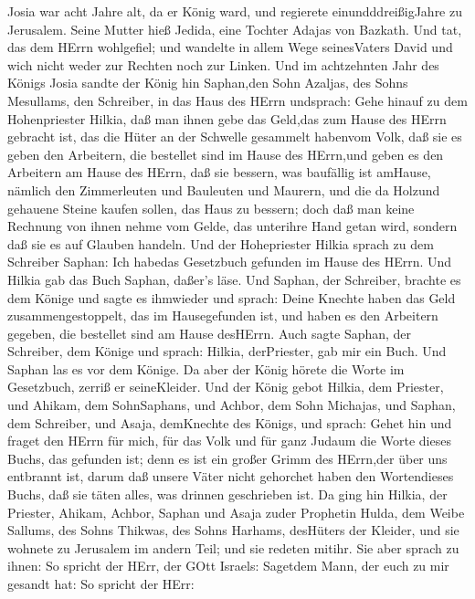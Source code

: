  Josia war acht Jahre alt, da er König ward, und regierete
einundddreißigJahre zu Jerusalem. Seine Mutter hieß Jedida, eine Tochter
Adajas von Bazkath.  Und tat, das dem HErrn wohlgefiel; und
wandelte in allem Wege seinesVaters David und wich nicht weder zur
Rechten noch zur Linken.  Und im achtzehnten Jahr des Königs
Josia sandte der König hin Saphan,den Sohn Azaljas, des Sohns Mesullams,
den Schreiber, in das Haus des HErrn undsprach:  Gehe hinauf
zu dem Hohenpriester Hilkia, daß man ihnen gebe das Geld,das zum Hause
des HErrn gebracht ist, das die Hüter an der Schwelle gesammelt habenvom
Volk,  daß sie es geben den Arbeitern, die bestellet sind im
Hause des HErrn,und geben es den Arbeitern am Hause des HErrn, daß sie
bessern, was baufällig ist amHause,  nämlich den
Zimmerleuten und Bauleuten und Maurern, und die da Holzund gehauene
Steine kaufen sollen, das Haus zu bessern;  doch daß man
keine Rechnung von ihnen nehme vom Gelde, das unterihre Hand getan wird,
sondern daß sie es auf Glauben handeln.  Und der
Hohepriester Hilkia sprach zu dem Schreiber Saphan: Ich habedas
Gesetzbuch gefunden im Hause des HErrn. Und Hilkia gab das Buch Saphan,
daßer's läse.  Und Saphan, der Schreiber, brachte es dem
Könige und sagte es ihmwieder und sprach: Deine Knechte haben das Geld
zusammengestoppelt, das im Hausegefunden ist, und haben es den Arbeitern
gegeben, die bestellet sind am Hause desHErrn.  Auch sagte
Saphan, der Schreiber, dem Könige und sprach: Hilkia, derPriester, gab
mir ein Buch. Und Saphan las es vor dem Könige.  Da aber
der König hörete die Worte im Gesetzbuch, zerriß er seineKleider.
 Und der König gebot Hilkia, dem Priester, und Ahikam, dem
SohnSaphans, und Achbor, dem Sohn Michajas, und Saphan, dem Schreiber,
und Asaja, demKnechte des Königs, und sprach:  Gehet hin
und fraget den HErrn für mich, für das Volk und für ganz Judaum die
Worte dieses Buchs, das gefunden ist; denn es ist ein großer Grimm des
HErrn,der über uns entbrannt ist, darum daß unsere Väter nicht gehorchet
haben den Wortendieses Buchs, daß sie täten alles, was drinnen
geschrieben ist.  Da ging hin Hilkia, der Priester, Ahikam,
Achbor, Saphan und Asaja zuder Prophetin Hulda, dem Weibe Sallums, des
Sohns Thikwas, des Sohns Harhams, desHüters der Kleider, und sie wohnete
zu Jerusalem im andern Teil; und sie redeten mitihr.  Sie
aber sprach zu ihnen: So spricht der HErr, der GOtt Israels: Sagetdem
Mann, der euch zu mir gesandt hat:  So spricht der HErr:
